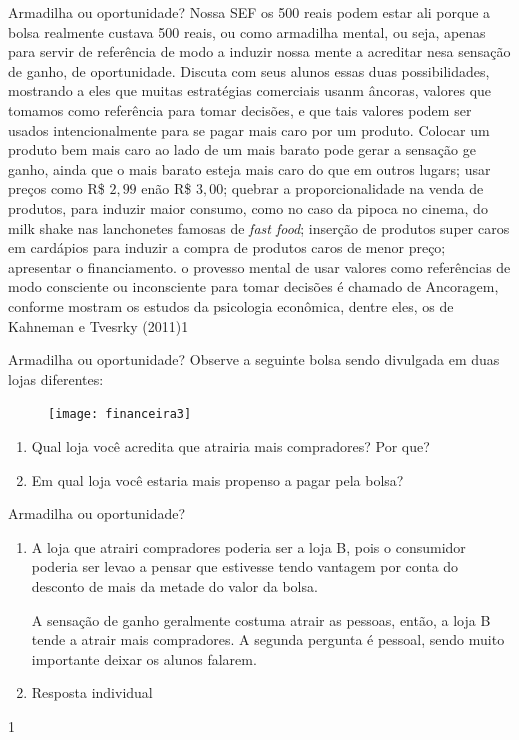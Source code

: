 \practice{}

\begin{Recomenda}{Armadilha ou oportunidade?}
{Nossa SEF os 500 reais podem estar ali porque a bolsa realmente custava 500 reais, ou como armadilha mental, ou seja, apenas para servir de referência de modo a induzir nossa mente a acreditar nesa sensação de ganho, de oportunidade. Discuta com seus alunos essas duas possibilidades, mostrando a eles que muitas estratégias comerciais usanm âncoras, valores que tomamos como referência para tomar decisões, e que tais valores podem ser usados intencionalmente para se pagar mais caro por um produto. Colocar um produto bem mais caro ao lado de um mais barato pode gerar a sensação ge ganho, ainda que o mais barato esteja mais caro do que em outros lugars; usar preços como R\$ $2{,}99$ enão R\$ $3{,}00$; quebrar a proporcionalidade na venda de produtos, para induzir maior consumo, como no caso da pipoca no cinema, do milk shake nas lanchonetes famosas de \textit{fast food}; inserção de produtos super caros em cardápios para induzir a compra de produtos caros de menor preço; apresentar o financiamento. o provesso mental de usar valores como referências de modo consciente ou inconsciente para tomar decisões é chamado de Ancoragem, conforme mostram os estudos da psicologia econômica, dentre eles, os de Kahneman e Tvesrky (2011)}{1}
\end{Recomenda}

\begin{task}{Armadilha ou oportunidade?}
Observe a seguinte bolsa sendo divulgada em duas lojas diferentes:

\begin{figure}[H]
\centering

\texttt{[image: financeira3]}
\end{figure}

\begin{enumerate}
  \item Qual loja você acredita que atrairia mais compradores? Por que?
  \item Em qual loja você estaria mais propenso a pagar pela bolsa?
\end{enumerate}
\end{task}
\begin{resposta}{Armadilha ou oportunidade?}
{\begin{enumerate}
  \item A loja que atrairi compradores poderia ser a loja B, pois o consumidor poderia ser levao a pensar que estivesse tendo vantagem por conta do desconto de mais da metade do valor da bolsa.

  A sensação de ganho geralmente costuma atrair as pessoas, então, a loja B tende a atrair mais compradores. A segunda pergunta é pessoal, sendo muito importante deixar os alunos falarem. 
  \item Resposta individual
\end{enumerate}}{1}

\end{resposta}
\clearpage

